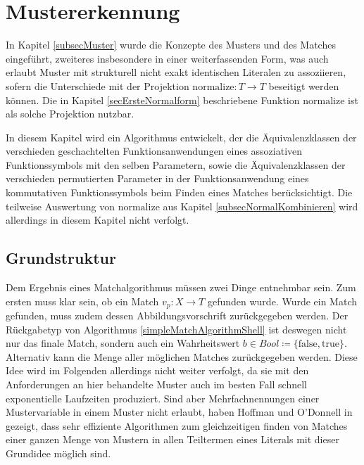 

\chapter{Mustererkennung} \label{secPattermatching}

In Kapitel \ref{subsecMuster} wurde die Konzepte des Musters und des Matches eingeführt, zweiteres insbesondere in einer weiterfassenden Form, was auch erlaubt Muster mit strukturell nicht exakt identischen Literalen zu assoziieren, sofern die Unterschiede mit der Projektion $\mathrm{normalize} \colon T \rightarrow T$ beseitigt werden können. Die in Kapitel \ref{secErsteNormalform} beschriebene Funktion $\mathrm{normalize}$ ist als solche Projektion nutzbar.  

In diesem Kapitel wird ein Algorithmus entwickelt, der die Äquivalenzklassen der verschieden geschachtelten Funktionsanwendungen eines assoziativen Funktionssymbols mit den selben Parametern, sowie die Äquivalenzklassen der verschieden permutierten Parameter in der Funktionsanwendung eines kommutativen Funktionssymbols beim Finden eines Matches berücksichtigt. Die teilweise Auswertung von $\mathrm{normalize}$ aus Kapitel \ref{subsecNormalKombinieren} wird allerdings in diesem Kapitel nicht verfolgt.


\section{Grundstruktur} \label{subsecPatternmatchingGrundstruktur}

Dem Ergebnis eines Matchalgorithmus müssen zwei Dinge entnehmbar sein. Zum ersten muss klar sein, ob ein Match $v_p \colon X \rightarrow T$ gefunden wurde. Wurde ein Match gefunden, muss zudem dessen Abbildungsvorschrift zurückgegeben werden. Der Rückgabetyp von Algorithmus \ref{simpleMatchAlgorithmShell} ist deswegen nicht nur das finale Match, sondern auch ein Wahrheitswert $b \in \mathit{Bool} \coloneqq \{\mathrm{false}, \mathrm{true}\}$. Alternativ kann die Menge aller möglichen Matches zurückgegeben werden. Diese Idee wird im Folgenden allerdings nicht weiter verfolgt, da sie mit den Anforderungen an hier behandelte Muster auch im besten Fall schnell exponentielle Laufzeiten produziert. Sind aber Mehrfachnennungen einer Mustervariable in einem Muster nicht erlaubt, haben Hoffman und O'Donnell in \cite{patternMatchingInTrees} gezeigt, dass sehr effiziente Algorithmen zum gleichzeitigen finden von Matches einer ganzen Menge von Mustern in allen Teiltermen eines Literals mit dieser Grundidee möglich sind.\\


